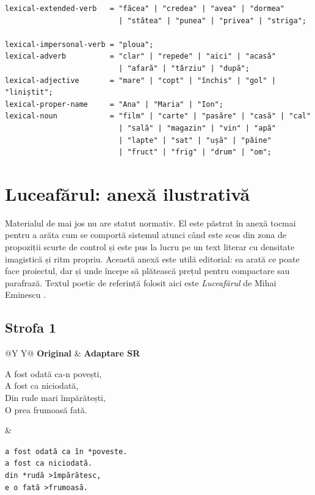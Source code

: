 \documentclass[12pt,onecolumn,letterpaper]{article}
\newcommand{\rs}[1]{\texttt{#1}}
\begin{document}
\begin{verbatim}
lexical-extended-verb   = "făcea" | "credea" | "avea" | "dormea"
                          | "stătea" | "punea" | "privea" | "striga";

lexical-impersonal-verb = "ploua";
lexical-adverb          = "clar" | "repede" | "aici" | "acasă"
                          | "afară" | "târziu" | "după";
lexical-adjective       = "mare" | "copt" | "închis" | "gol" | "liniștit";
lexical-proper-name     = "Ana" | "Maria" | "Ion";
lexical-noun            = "film" | "carte" | "pasăre" | "casă" | "cal"
                          | "sală" | "magazin" | "vin" | "apă"
                          | "lapte" | "sat" | "ușă" | "pâine"
                          | "fruct" | "frig" | "drum" | "om";
\end{verbatim}
\normalsize

\section{Luceafărul: anexă ilustrativă}

Materialul de mai jos nu are statut normativ. El este păstrat în anexă tocmai
pentru a arăta cum se comportă sistemul atunci când este scos din zona de propoziții
scurte de control și este pus la lucru pe un text literar cu densitate imagistică și
ritm propriu. Această anexă este utilă editorial: ea arată ce poate face proiectul,
dar și unde începe să plătească prețul pentru compactare sau parafrază. Textul
poetic de referință folosit aici este \textit{Luceafărul} de Mihai Eminescu
\cite{eminescu-luceafarul}.

\small

\subsection*{Strofa 1}
\noindent
\begin{tabularx}{\linewidth}{@{}Y Y@{}}
\textbf{Original} & \textbf{Adaptare SR} \\
\begin{minipage}[t]{\linewidth}\vspace{0pt}
A fost odată ca-n povești,\\
A fost ca niciodată,\\
Din rude mari împărătești,\\
O prea frumoasă fată.
\end{minipage}
&
\begin{minipage}[t]{\linewidth}\vspace{0pt}
\rs{a fost odată ca în *poveste.}\\
\rs{a fost ca niciodată.}\\
\rs{din *rudă >împărătesc,}\\
\rs{e o fată >frumoasă.}
\end{minipage}
\\
\end{tabularx}
\end{document}
